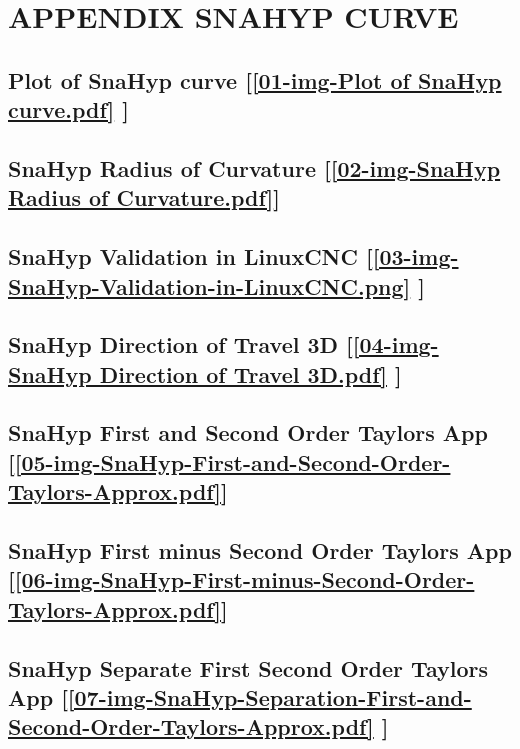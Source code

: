 \section{\textbf{APPENDIX SNAHYP CURVE}} \label{APPENDIX SNAHYP CURVE}


\subsection       {Plot of SnaHyp curve
	[\ref  {01-img-Plot of SnaHyp curve.pdf} ] }
\label{ssec-01-img-Plot of SnaHyp curve.pdf}

\subsection       {SnaHyp Radius of Curvature
	[\ref      {02-img-SnaHyp Radius of Curvature.pdf}] }
\label{ssec-02-img-SnaHyp Radius of Curvature.pdf}

\subsection       {SnaHyp Validation in LinuxCNC
	[\ref      {03-img-SnaHyp-Validation-in-LinuxCNC.png} ] }
\label{ssec-03-img-SnaHyp-Validation-in-LinuxCNC.png}

\subsection     {SnaHyp Direction of Travel 3D
	[\ref      {04-img-SnaHyp Direction of Travel 3D.pdf} ] }
\label{ssec-04-img-SnaHyp Direction of Travel 3D.pdf}

\subsection       {SnaHyp First and Second Order Taylors App
	[\ref      {05-img-SnaHyp-First-and-Second-Order-Taylors-Approx.pdf}] }
\label{ssec-05-img-SnaHyp-First-and-Second-Order-Taylors-Approx.pdf}

\subsection       {SnaHyp First minus Second Order Taylors App
	[\ref      {06-img-SnaHyp-First-minus-Second-Order-Taylors-Approx.pdf}] }
\label{ssec-06-img-SnaHyp-First-minus-Second-Order-Taylors-Approx.pdf}

\subsection       {SnaHyp Separate First Second Order Taylors App
	[\ref      {07-img-SnaHyp-Separation-First-and-Second-Order-Taylors-Approx.pdf} ] }
\label{ssec-07-img-SnaHyp-Separation-First-and-Second-Order-Taylors-Approx.pdf}

